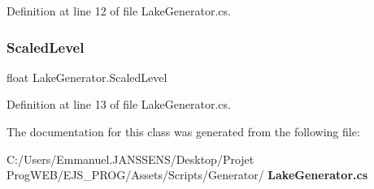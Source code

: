 Definition at line 12 of file Lake\+Generator.\+cs.

\mbox{\label{class_lake_generator_a137caa523d56a14268b2a07780014a88}} 
\subsubsection{Scaled\+Level}
{\footnotesize\ttfamily float Lake\+Generator.\+Scaled\+Level\hspace{0.3cm}{\ttfamily [get]}}



Definition at line 13 of file Lake\+Generator.\+cs.



The documentation for this class was generated from the following file\+:\begin{DoxyCompactItemize}
\item 
C\+:/\+Users/\+Emmanuel.\+J\+A\+N\+S\+S\+E\+N\+S/\+Desktop/\+Projet Prog\+W\+E\+B/\+E\+J\+S\+\_\+\+P\+R\+O\+G/\+Assets/\+Scripts/\+Generator/\textbf{ Lake\+Generator.\+cs}\end{DoxyCompactItemize}
